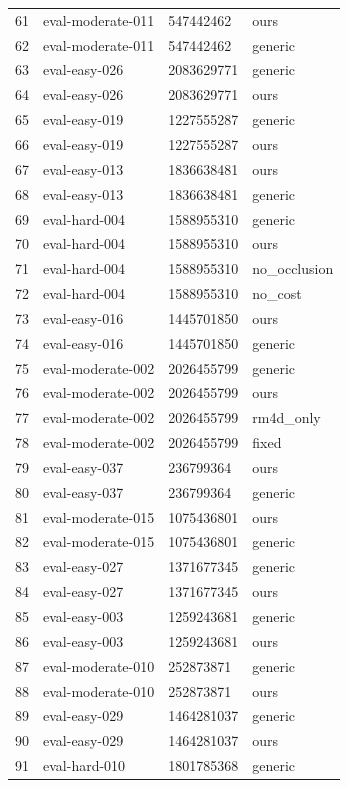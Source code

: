 \begin{tabular}{llll}
61 & eval-moderate-011 & 547442462 & ours \\
62 & eval-moderate-011 & 547442462 & generic \\
63 & eval-easy-026 & 2083629771 & generic \\
64 & eval-easy-026 & 2083629771 & ours \\
65 & eval-easy-019 & 1227555287 & generic \\
66 & eval-easy-019 & 1227555287 & ours \\
67 & eval-easy-013 & 1836638481 & ours \\
68 & eval-easy-013 & 1836638481 & generic \\
69 & eval-hard-004 & 1588955310 & generic \\
70 & eval-hard-004 & 1588955310 & ours \\
71 & eval-hard-004 & 1588955310 & no\_occlusion \\
72 & eval-hard-004 & 1588955310 & no\_cost \\
73 & eval-easy-016 & 1445701850 & ours \\
74 & eval-easy-016 & 1445701850 & generic \\
75 & eval-moderate-002 & 2026455799 & generic \\
76 & eval-moderate-002 & 2026455799 & ours \\
77 & eval-moderate-002 & 2026455799 & rm4d\_only \\
78 & eval-moderate-002 & 2026455799 & fixed \\
79 & eval-easy-037 & 236799364 & ours \\
80 & eval-easy-037 & 236799364 & generic \\
81 & eval-moderate-015 & 1075436801 & ours \\
82 & eval-moderate-015 & 1075436801 & generic \\
83 & eval-easy-027 & 1371677345 & generic \\
84 & eval-easy-027 & 1371677345 & ours \\
85 & eval-easy-003 & 1259243681 & generic \\
86 & eval-easy-003 & 1259243681 & ours \\
87 & eval-moderate-010 & 252873871 & generic \\
88 & eval-moderate-010 & 252873871 & ours \\
89 & eval-easy-029 & 1464281037 & generic \\
90 & eval-easy-029 & 1464281037 & ours \\
91 & eval-hard-010 & 1801785368 & generic \\

\end{tabular}
